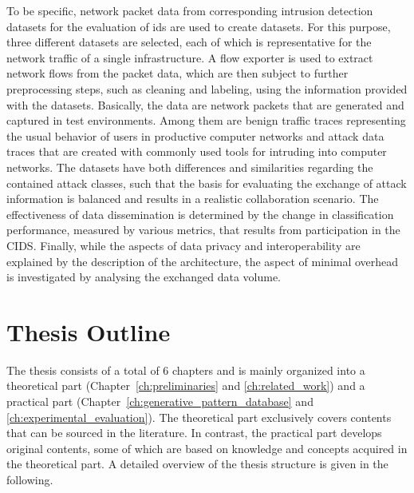 \documentclass[../../main.tex]{subfiles}
\begin{document}
To be specific, network packet data from corresponding intrusion detection datasets for the evaluation of \gls{ids} are used to create datasets. For this purpose, three different datasets are selected, each of which is representative for the network traffic of a single infrastructure. A flow exporter is used to extract network flows from the packet data, which are then subject to further preprocessing steps, such as cleaning and labeling, using the information provided with the datasets.
Basically, the data are network packets that are generated and captured in test environments. Among them are benign traffic traces representing the usual behavior of users in productive computer networks and attack data traces that are created with commonly used tools for intruding into computer networks. The datasets have both differences and similarities regarding the contained attack classes, such that the basis for evaluating the exchange of attack information is balanced and results in a realistic collaboration scenario. The effectiveness of data dissemination is determined by the change in classification performance, measured by various metrics, that results from participation in the CIDS. Finally, while the aspects of data privacy and interoperability are explained by the description of the architecture, the aspect of minimal overhead is investigated by analysing the exchanged data volume.

\section{Thesis Outline}

The thesis consists of a total of 6 chapters and is mainly organized into a theoretical part (Chapter~\ref{ch:preliminaries} and \ref{ch:related_work}) and a practical part (Chapter~\ref{ch:generative_pattern_database} and \ref{ch:experimental_evaluation}). The theoretical part exclusively covers contents that can be sourced in the literature. In contrast, the practical part develops original contents, some of which are based on knowledge and concepts acquired in the theoretical part. A detailed overview of the thesis structure is given in the following.
\end{document}
